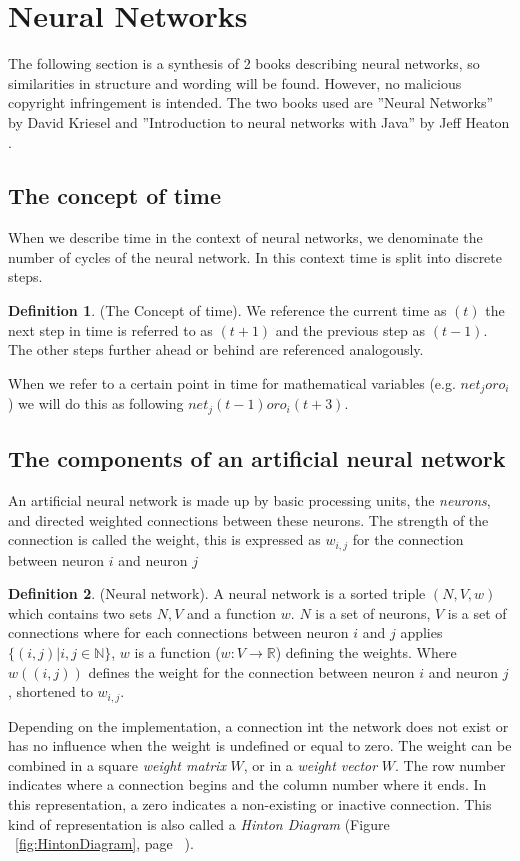 \documentclass[pdftex,a4paper,12pt,twoside]{report}
\theoremstyle{plain} \newtheorem{theorem}{Theorem} \newtheorem{proposition}{Proposition} \newtheorem{lemma}{Lemma} \newtheorem*{corollary}{Corollary}
\theoremstyle{definition} \newtheorem{definition}{Definition} \newtheorem{conjecture}{Conjecture} \newtheorem*{example}{Example} \newtheorem{algorithm}{Algorithm}
\theoremstyle{remark} \newtheorem*{remark}{Remark} \newtheorem*{note}{Note} \newtheorem{case}{Case}
\begin{document}
\section{Neural Networks}
\label{sec:neuralnetworks}
The following section is a synthesis of 2 books describing neural networks, so similarities in structure and wording will be found. However, no malicious copyright infringement is intended. The two books used are ''Neural Networks'' by David Kriesel \citep{Kriesel2013} and ''Introduction to neural networks with Java'' by Jeff Heaton \citep{Heaton2005}.
\subsection{The concept of time}
When we describe time in the context of neural networks, we denominate the number of cycles of the neural network. In this context time is split into discrete steps.
\begin{definition}(The Concept of time). We reference the current time as $(t)$ the next step in time is referred to as $(t+1)$ and the previous step as $(t-1)$. The other steps further ahead or behind are referenced analogously. \end{definition} When we refer to a certain point in time for mathematical variables (e.g. $net_j or o_i$) we will do this as following $net_j(t-1) or o_i(t+3)$.
\subsection{The components of an artificial neural network}
An artificial neural network is made up by basic processing units, the \emph{neurons}, and directed weighted connections between these neurons. The strength of the connection is called the weight, this is expressed as $w_{i,j}$ for the connection between neuron $i$ and neuron $j$
\begin{definition}
(Neural network). A neural network is a sorted triple $(N, V, w)$ which contains two sets $N, V$ and a function $w$. $N$ is a set of neurons, $V$ is a set of connections where for each connections between neuron $i$ and $j$ applies $\{(i,j)|i,j \in  \mathbb{N}\}$, $w$ is a function ($w : V \to \mathbb{R}$) defining the weights. Where $w((i,j))$ defines the weight for the connection between neuron $i$ and neuron $j$, shortened to $w_{i,j}$.
\end{definition} Depending on the implementation, a connection int the network does not exist or has no influence when the weight is undefined or equal to zero. The weight can be combined in a square \emph{weight matrix} $W$, or in a \emph{weight vector} $W$. The row number indicates where a connection begins and the column number where it ends. In this representation, a zero indicates a non-existing or inactive connection. This kind of representation is also called a \emph{Hinton Diagram} (Figure ~\ref{fig:HintonDiagram}, page ~\pageref{fig:HintonDiagram}).
\end{document}
